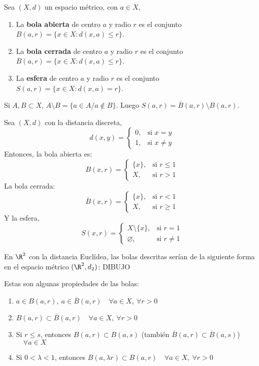 \begin{ndef}
  Sea $(X,d)$ un espacio métrico, con $a \in X$,
  \begin{enumerate}
    \item La \textbf{bola abierta} de centro $a$ y radio $r$ es el conjunto $B(a,r)= \{x \in X : d(x,a) \leq r\}$.
    \item La \textbf{bola cerrada} de centro $a$ y radio $r$ es el conjunto $\overline{B}(a,r)= \{x \in X : d(  x,a) \leq r\}$.
    \item La \textbf{esfera} de centro $a$ y radio $r$ es el conjunto $S(a,r)= \{x \in X : d(  x,a) = r\}$.
  \end{enumerate}
\end{ndef}
\begin{note}
    Si $A,B \subset X$, $A\setminus B = \{a \in A / a \not \in B\}$. Luego $S(a,r) = \overline{B}(a,r) \setminus B(a,r)$.
\end{note}
\begin{exmp}
  Sea $(X,d)$ con la distancia discreta,
  \[ d(x,y)=
    \begin{cases}
      0, & \text{si } x=y \\ 1,& \text{si } x\neq y
    \end{cases}\]
    Entonces, la bola abierta es:
    \[ B(x,r)=
    \begin{cases}
      \{x\}, & \text{si } r \leq 1 \\ X,& \text{si } r > 1
    \end{cases}\]
    La bola cerrada:
    \[ \overline{B}(x,r)=
    \begin{cases}
      \{x\}, & \text{si } r < 1 \\ X,& \text{si } r \geq 1
    \end{cases}\]
    Y la esfera,
    \[ S(x,r)=
    \begin{cases}
      X \setminus \{x\}, & \text{si } r = 1 \\ \varnothing,& \text{si } r \neq 1
    \end{cases}\]
\end{exmp}

\begin{exmp}
  En $\R^2$ con la distancia Euclídea, las bolas descritas serían de la siguiente forma en el espacio métrico $(\R^2,d_2)$:
  DIBUJO
\end{exmp}

\begin{properties} Estas son algunas propiedades de las bolas:
  \begin{enumerate}
    \item $a \in B(a,r),\ a \in \overline{B}(a,r) \quad \forall a \in X,\ \forall r>0$
    \item $B(a,r) \subset \overline{B}(a,r) \quad \forall a \in X,\ \forall r>0$
    \item Si $r \leq s$, entonces $B(a,r) \subset B(a,s)$ (también $\overline{B}(a,r) \subset \overline{B}(a,s)$) $\quad \forall a \in X$
    \item Si $0<\lambda<1$, entonces $B(a,\lambda r) \subset B(a,r) \quad \forall a \in X,\ \forall r>0$
  \end{enumerate}
\end{properties}

